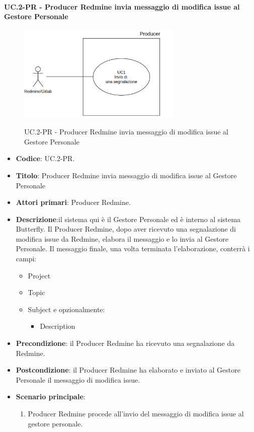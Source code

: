	\paragraph{UC\theuccount.2-PR - Producer Redmine invia messaggio di modifica issue al Gestore Personale}
	\begin{figure}[H]
		\centering
		\includegraphics[width=0.7\textwidth]{img/UC1.png}\\
		\caption{UC\theuccount.2-PR - Producer Redmine invia messaggio di modifica issue al Gestore Personale}
	\end{figure}
	\begin{itemize}
		\item \textbf{Codice}: UC\theuccount.2-PR.
		\item \textbf{Titolo}: Producer Redmine invia messaggio di modifica issue al Gestore Personale
		\item \textbf{Attori primari}: Producer Redmine.
		\item \textbf{Descrizione}:il sistema qui è il Gestore Personale
		ed è interno al sistema Butterfly. Il Producer Redmine, dopo aver
		ricevuto una segnalazione di modifica issue da Redmine, elabora
		il messaggio e lo invia al Gestore Personale.
		Il messaggio finale, una volta terminata l'elaborazione, conterrà i campi:
		\begin{itemize}
			\item Project
			\item Topic
			\item Subject e opzionalmente:
			\begin{itemize}
				\item Description
			\end{itemize}
		\end{itemize}
		\item \textbf{Precondizione}: il Producer Redmine ha ricevuto una segnalazione da Redmine.
		\item \textbf{Postcondizione}: il Producer Redmine ha elaborato e inviato al Gestore Personale il messaggio di modifica issue.
		\item \textbf{Scenario principale}: 
		\begin{enumerate}
			\item Producer Redmine procede all'invio del messaggio di
			modifica issue al gestore personale.
		\end{enumerate}
		
	\end{itemize}